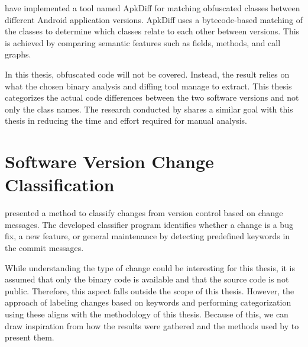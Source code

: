 \textcite{android_matching} have implemented a tool named ApkDiff for matching obfuscated classes between different Android application versions. ApkDiff uses a bytecode-based matching of the classes to determine which classes relate to each other between versions. This is achieved by comparing semantic features such as fields, methods, and call graphs.

In this thesis, obfuscated code will not be covered. Instead, the result relies on what the chosen binary analysis and diffing tool manage to extract. This thesis categorizes the actual code differences between the two software versions and not only the class names. The research conducted by \textcite{android_matching} shares a similar goal with this thesis in reducing the time and effort required for manual analysis.  

\section{Software Version Change Classification}
\label{sec:related_work:classify_detection}
\textcite{classification_of_change_messages} presented a method to classify changes from version control based on change messages. The developed classifier program identifies whether a change is a bug fix, a new feature, or general maintenance by detecting predefined keywords in the commit messages. 

While understanding the type of change could be interesting for this thesis, it is assumed that only the binary code is available and that the source code is not public. Therefore, this aspect falls outside the scope of this thesis. However, the approach of labeling changes based on keywords and performing categorization using these aligns with the methodology of this thesis. Because of this, we can draw inspiration from how the results were gathered and the methods used by \textcite{classification_of_change_messages} to present them.

